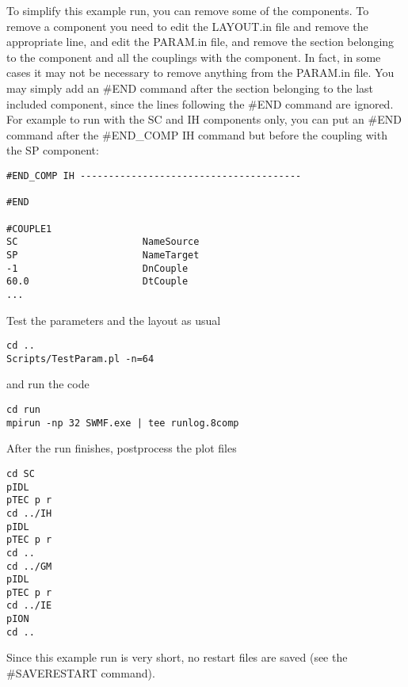 To simplify this example run, you can remove some of the components.
To remove a component you need to edit the LAYOUT.in file and remove the
appropriate line, and edit the PARAM.in file, and remove the 
section belonging to the component and all the couplings with the 
component. In fact, in some cases it may not be necessary to remove 
anything from the PARAM.in file. You may simply add an \#END command
after the section belonging to the last included component,
since the lines following the \#END command are ignored.
For example to run with the SC and IH components only, you can put an
\#END command after the \#END\_COMP IH command but before the coupling
with the SP component:
\begin{verbatim}
#END_COMP IH ---------------------------------------

#END

#COUPLE1
SC                      NameSource
SP                      NameTarget
-1                      DnCouple
60.0                    DtCouple
...

\end{verbatim}
Test the parameters and the layout as usual
\begin{verbatim}
cd ..
Scripts/TestParam.pl -n=64
\end{verbatim}
and run the code
\begin{verbatim}
cd run
mpirun -np 32 SWMF.exe | tee runlog.8comp
\end{verbatim}
After the run finishes, postprocess the plot files
\begin{verbatim}
cd SC
pIDL
pTEC p r
cd ../IH
pIDL
pTEC p r
cd ..
cd ../GM
pIDL
pTEC p r
cd ../IE
pION
cd ..
\end{verbatim}
Since this example run is very short, no restart files are saved
(see the \#SAVERESTART command).
